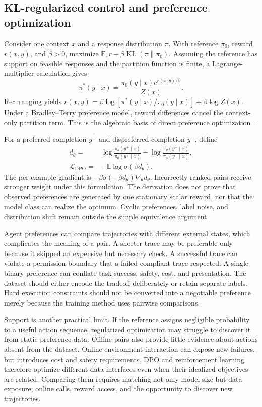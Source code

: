 \subsection{KL-regularized control and preference optimization}
\label{sec:C08:dpo}
Consider one context $x$ and a response distribution $\pi$. With reference $\pi_0$, reward $r(x,y)$, and $\beta>0$, maximize $\mathbb E_\pi r-\beta\operatorname{KL}(\pi\|\pi_0)$. Assuming the reference has support on feasible responses and the partition function is finite, a Lagrange-multiplier calculation gives
\begin{equation}
 \pi^*(y\mid x)=\frac{\pi_0(y\mid x)e^{r(x,y)/\beta}}
 {Z(x)}.
\end{equation}
Rearranging yields $r(x,y)=\beta\log[\pi^*(y\mid x)/\pi_0(y\mid x)]+\beta\log Z(x)$. Under a Bradley--Terry preference model, reward differences cancel the context-only partition term. This is the algebraic basis of direct preference optimization~\cite{rafailov2023dpo}.

For a preferred completion $y^+$ and dispreferred completion $y^-$, define
\begin{align}
 d_\theta={}&\log\frac{\pi_\theta(y^+\mid x)}{\pi_0(y^+\mid x)}
 -\log\frac{\pi_\theta(y^-\mid x)}{\pi_0(y^-\mid x)},\\
 \mathcal L_{\mathrm{DPO}}={}&-\mathbb E\log\sigma(\beta d_\theta).
\end{align}
The per-example gradient is $-\beta\sigma(-\beta d_\theta)\nabla_\theta d_\theta$. Incorrectly ranked pairs receive stronger weight under this formulation. The derivation does not prove that observed preferences are generated by one stationary scalar reward, nor that the model class can realize the optimum. Cyclic preferences, label noise, and distribution shift remain outside the simple equivalence argument.

Agent preferences can compare trajectories with different external states, which complicates the meaning of a pair. A shorter trace may be preferable only because it skipped an expensive but necessary check. A successful trace can violate a permission boundary that a failed compliant trace respected. A single binary preference can conflate task success, safety, cost, and presentation. The dataset should either encode the tradeoff deliberately or retain separate labels. Hard execution constraints should not be converted into a negotiable preference merely because the training method uses pairwise comparisons.

Support is another practical limit. If the reference assigns negligible probability to a useful action sequence, regularized optimization may struggle to discover it from static preference data. Offline pairs also provide little evidence about actions absent from the dataset. Online environment interaction can expose new failures, but introduces cost and safety requirements. DPO and reinforcement learning therefore optimize different data interfaces even when their idealized objectives are related. Comparing them requires matching not only model size but data exposure, online calls, reward access, and the opportunity to discover new trajectories.

